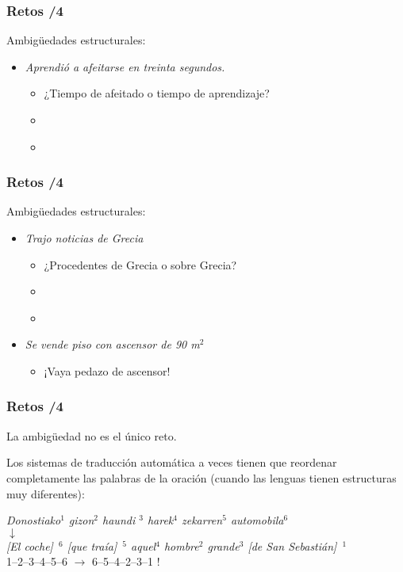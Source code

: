 \documentclass{beamer}
\begin{document}
\begin{frame}
  \frametitle{Retos /4}
  Ambigüedades estructurales:
  \begin{itemize}
  \item \emph{Aprendió a afeitarse en treinta segundos.}
    \begin{itemize}
    \item ¿Tiempo de afeitado o tiempo de aprendizaje?
    \item \emph{ } 
    \item \emph{ } 
    \end{itemize}
  \end{itemize}
\end{frame}

\begin{frame}
  \frametitle{Retos /4}
  Ambigüedades estructurales:
  \begin{itemize}
  \item \emph{Trajo noticias de Grecia}
    \begin{itemize}
    \item ¿Procedentes de Grecia o sobre Grecia?
    \item \emph{}
    \item \emph{ }
    \end{itemize}
  \item \emph{Se vende piso con ascensor de 90 m$^2$}
    \begin{itemize}
    \item ¡Vaya pedazo de ascensor!
    \end{itemize}
  \end{itemize}
\end{frame}

\begin{frame}
\frametitle{Retos /4}
La ambigüedad no es el único reto.

Los sistemas de traducción automática a veces tienen que reordenar completamente las palabras de la oración (cuando las lenguas tienen estructuras muy diferentes):
\begin{center}
  \emph{Donostiako$^1$ gizon$^2$ haundi $^3$ harek$^4$ zekarren$^5$ automobila$^6$} \\ 
  $\downarrow$
  \\
  \emph{[El coche]\ $^6$ [que traía]\ $^5$ aquel$^4$ hombre$^2$ grande$^3$ [de San Sebastián]\ $^1$} \\[1cm]
 1--2--3--4--5--6 $\to$ 6--5--4--2--3--1 ! 
\end{center}
\end{frame}
\end{document}
